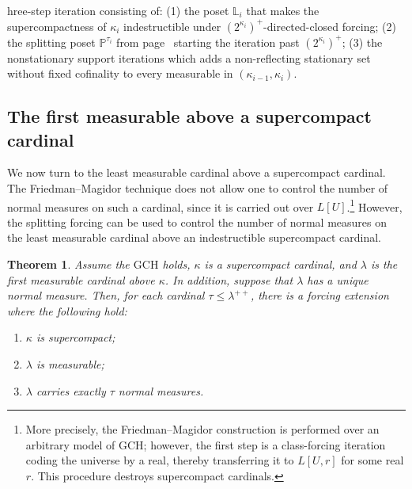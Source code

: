 \documentclass[11pt]{amsart}
\newtheorem{theorem}{Theorem}[section]
\theoremstyle{definition}
\theoremstyle{remark}
\newcommand\<{{<}}
\begin{document}
hree-step iteration consisting of: (1) the poset $\mathbb{L}_i$ that makes the supercompactness of $\kappa_i$ indestructible under $(2^{\kappa_i})^+$-directed-closed forcing; (2) the splitting poset $\mathbb{P}^{\tau_i}$ from page~\pageref{page: splitting forcing} starting the iteration past $(2^{\kappa_i})^+$; (3) the nonstationary support iterations which adds a non-reflecting stationary set without fixed cofinality to every measurable in $(\kappa_{i-1},\kappa_i)$.


\subsection{The first measurable above a supercompact cardinal}

We now turn to the least measurable cardinal above a supercompact cardinal. The Friedman–Magidor technique \cite{FriedmanMagidor} does not allow one to control the number of normal measures on such a cardinal, since it is carried out over $L[U]$.\footnote{More precisely, the Friedman–Magidor construction is performed over an arbitrary model of GCH; however, the first step is a class-forcing iteration coding the universe by a real, thereby transferring it to $L[U,r]$ for some real $r$. This procedure destroys supercompact cardinals.} However, the splitting forcing can be used to control the number of normal measures on the least measurable cardinal above an indestructible supercompact cardinal.
\begin{theorem}\label{thm: above supercompact}
    Assume the $\mathrm{GCH}$ holds,  $\kappa$ is a supercompact cardinal, and $\lambda$ is the first measurable cardinal above $\kappa$. In addition, suppose that $\lambda$ has a unique normal measure. Then, for each cardinal $\tau\leq \lambda^{++}$, there is a forcing extension  where the following hold:
    \begin{enumerate}
        \item  $\kappa$ is supercompact;
        \item  $\lambda$ is measurable;
        \item $\lambda$ carries exactly $\tau$ normal measures.
    \end{enumerate}
\end{theorem}
\end{document}
